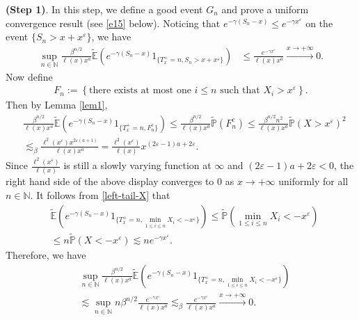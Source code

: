 \documentclass[10pt,a4paper]{amsart}
\numberwithin{equation}{section}
\begin{document}
\noindent
{\bf(Step 1)}. In this step, we define a good event $G_n$ and prove a uniform convergence result (see \eqref{e15} below). 
Noticing that $e^{-\gamma (S_n-x)}\leq e^{-\gamma x^{\varepsilon}}$ on the event $\{S_n>x+x^\varepsilon\}$, we have 
\begin{align}\label{e15-1}
	\sup_{n\in \mathbb{N}} \frac{  \beta^{n/2}  }{\ell(x) x^a} \widetilde{\mathbb{E}}\left(e^{-\gamma (S_n-x)}1_{\{T_x^+=n, S_n> x+ x^{\varepsilon}\}}\right) & \leq 	\frac{  e^{-\gamma x^{\varepsilon}} }{\ell(x) x^a} \stackrel{x\to+\infty}{\longrightarrow}0.  
\end{align}
Now define 
\begin{align}\label{def-of-F}
	F_n:= \left\{ \mbox{there exists at most one }i \leq n \mbox{ such that } X_i>x^\varepsilon \right\}.
\end{align}
Then by Lemma \ref{lem1},
\begin{align}\label{e15-2}
	& \frac{  \beta^{n/2}  }{\ell(x) x^a} \widetilde{\mathbb{E}}\left(e^{-\gamma (S_n-x)}1_{\{T_x^+=n, F_n^c\}}\right)  \leq 	\frac{  \beta^{n/2}  }{\ell(x) x^a}  \widetilde{\mathbb{P}}\left(  F_n^c \right)  \leq  \frac{\beta^{n/2} n^2 }{\ell(x) x^a}\widetilde{\mathbb{P}}\left( X>x^\varepsilon \right)^2 \nonumber\\
	& \lesssim_\beta \frac{\ell^2(x^{\varepsilon}) x^{2\varepsilon(a+1)}}{\ell(x) x^a}  = \frac{\ell^2(x^{\varepsilon}) }{\ell(x) } x^{(2\varepsilon-1)a + 2\varepsilon}.
\end{align}
Since $\frac{\ell^2(x^{\varepsilon}) }{\ell(x) } $ is still a slowly varying function at $\infty$ and $(2\varepsilon-1)a + 2\varepsilon<0$, the right hand side of the above display converges to $0$ as $x\to+\infty$ uniformly for all $n\in \mathbb{N}$. 
It follows from \eqref{left-tail-X} that
\begin{align}\label{e15-4}
	&\widetilde{\mathbb{E}}\left(e^{-\gamma (S_n-x)}1_{\{T_x^+=n, \min_{1\leq i\leq n} X_i <-x^{\varepsilon}\}}\right)  \leq  \widetilde{\mathbb{P}}\left( \min_{1\leq i\leq n} X_i< -x^{\varepsilon}\right)\nonumber\\
	& \leq n \widetilde{\mathbb{P}}\left(X<-x^{\varepsilon}\right) \lesssim  ne^{-\gamma x^{\varepsilon}} .
\end{align}
Therefore, we have 
\begin{align}\label{e15-3}
	& \sup_{n\in \mathbb{N}}\frac{ \beta^{n/2} }{\ell(x) x^a}\widetilde{\mathbb{E}}\left(e^{-\gamma (S_n-x)}1_{\{T_x^+=n, \min_{1\leq i\leq n} X_i < -x^{\varepsilon}\}}\right)  \nonumber\\
	&\lesssim  \sup_{n\in \mathbb{N}} n \beta^{n/2}  \frac{e^{-\gamma x^{\varepsilon}}}{\ell(x)x^a} \lesssim_\beta \frac{e^{-\gamma x^{\varepsilon}}}{\ell(x)x^a}\stackrel{x\to+\infty}{\longrightarrow}0. 
\end{align}
\end{document}
